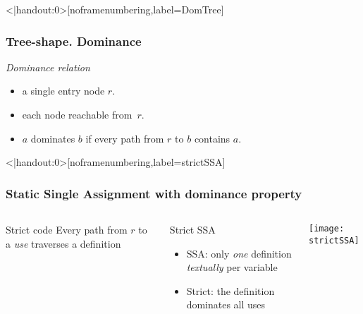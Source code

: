 \begin{frame}<|handout:0>[noframenumbering,label=DomTree]
\frametitle{Tree-shape. Dominance}

\begin{minipage}{0.48\textwidth}
    \emph{Dominance relation}
    \begin{itemize}
    \item a single entry node $r$.
    \item each node reachable from~$r$.
    \item $a$ dominates $b$ if every path from $r$ to $b$ contains $a$.
    \end{itemize}
    
\end{minipage}
\hfill
\begin{minipage}{0.5\textwidth}
%
%
%
\end{minipage}
\end{frame}

\begin{frame}<|handout:0>[noframenumbering,label=strictSSA]
  \frametitle{Static Single Assignment with dominance property}
  \begin{columns}
    \begin{block}{Strict code}
      Every path from $r$ to a \emph{use} traverses a definition
    \end{block}
    \begin{block}{Strict SSA}
      \begin{itemize}
      \item \alert{SSA}: only \emph{one} definition \emph{textually} per variable
      \item \alert{Strict}: the definition dominates all uses
      \end{itemize}
    \end{block}
    \hfill
    \texttt{[image: strictSSA]}
  \end{columns}
\end{frame}

